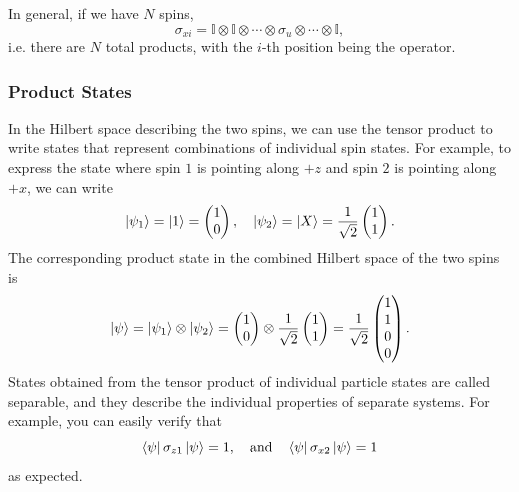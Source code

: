 \documentclass{article}
\begin{document}
In general, if we have $N$ spins,
\[
    \sigma _{xi}=\mathbb{I}\otimes \mathbb{I}\otimes \cdots\otimes \sigma _u\otimes \cdots\otimes \mathbb{I},
\]
i.e. there are $N$ total products, with the $i$-th position being the operator.

\subsubsection{Product States}
In the Hilbert space describing the two spins, we can use the tensor product to write states that represent combinations of individual spin states. For example, to express the state where spin $1$ is pointing along $+z$ and spin $2$ is pointing along $+x$, we can write
\[
    \ket{\psi _1}=\ket{1}=\begin{pmatrix}
        1\\0
    \end{pmatrix},\quad \ket{\psi _2}=\ket{X}=\frac{1}{\sqrt{2}}\begin{pmatrix}
        1\\1
    \end{pmatrix}.
\]
The corresponding product state in the combined Hilbert space of the two spins is
\[
    \ket{\psi }=\ket{\psi _1}\otimes \ket{\psi _2}=\begin{pmatrix}
        1\\0
    \end{pmatrix}\otimes \frac{1}{\sqrt{2}}\begin{pmatrix}
        1\\1
    \end{pmatrix}=\frac{1}{\sqrt{2}}\begin{pmatrix}
        1\\1\\0\\0
    \end{pmatrix}.
\]
States obtained from the tensor product of individual particle states are called separable, and they describe the individual properties of separate systems. For example, you can easily verify that
\[
    \bra{\psi }\sigma _{z1}\ket{\psi }=1,\quad \text{and}\quad \bra{\psi }\sigma _{x 2}\ket{\psi }=1
\]
as expected.
\end{document}
